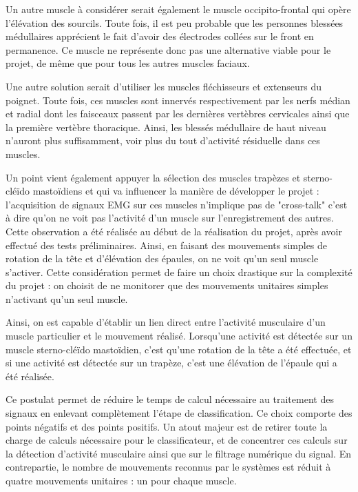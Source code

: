 \documentclass[letterpaper, twoside, 12pt, memoire, creativecommons, hyperref]{thETS}
\begin{document}
Un autre muscle à considérer serait également le muscle occipito-frontal qui opère l'élévation des sourcils. Toute fois, il est peu probable que les personnes blessées médullaires apprécient le fait d'avoir des électrodes collées sur le front en permanence. Ce muscle ne représente donc pas une alternative viable pour le projet, de même que pour tous les autres muscles faciaux.

Une autre solution serait d'utiliser les muscles fléchisseurs et extenseurs du poignet. Toute fois, ces muscles sont innervés respectivement par les nerfs médian et radial dont les faisceaux passent par les dernières vertèbres cervicales ainsi que la première vertèbre thoracique. Ainsi, les blessés médullaire de haut niveau n'auront plus suffisamment, voir plus du tout d'activité résiduelle dans ces muscles.

Un point vient également appuyer la sélection des muscles trapèzes et sterno-cléïdo mastoïdiens et qui va influencer la manière de développer le projet : l'acquisition de signaux EMG sur ces muscles n'implique pas de "cross-talk" c'est à dire qu'on ne voit pas l'activité d'un muscle sur l'enregistrement des autres. Cette observation a été réalisée au début de la réalisation du projet, après avoir effectué des tests préliminaires. Ainsi, en faisant des mouvements simples de rotation de la tête et d'élévation des épaules, on ne voit qu'un seul muscle s'activer. Cette considération permet de faire un choix drastique sur la complexité du projet : on choisit de ne monitorer que des mouvements unitaires simples n'activant qu'un seul muscle. 

Ainsi, on est capable d'établir un lien direct entre l'activité musculaire d'un muscle particulier et le mouvement réalisé. Lorsqu'une activité est détectée sur un muscle sterno-cléïdo mastoïdien, c'est qu'une rotation de la tête a été effectuée, et si une activité est détectée sur un trapèze, c'est une élévation de l'épaule qui a été réalisée.

Ce postulat permet de réduire le temps de calcul nécessaire au traitement des signaux en enlevant complètement l'étape de classification. Ce choix comporte des points négatifs et des points positifs. Un atout majeur est de retirer toute la charge de calculs nécessaire pour le classificateur, et de concentrer ces calculs sur la détection d'activité musculaire ainsi que sur le filtrage numérique du signal. En contrepartie, le nombre de mouvements reconnus par le systèmes est réduit à quatre mouvements unitaires : un pour chaque muscle. 
\end{document}
